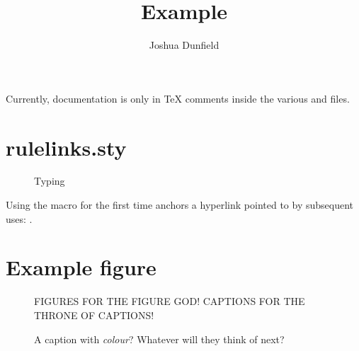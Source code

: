 \documentclass{purple}
\title{Example}
\author{Joshua Dunfield}
\begin{document}
\maketitle

Currently, documentation is only in TeX comments inside the various  and  files.

\section{rulelinks.sty}

\begin{figure}[htbp]
  \centering

  \begin{mathpar}
  \end{mathpar}
  
  \caption{Typing}
  \label{fig:typing}
\end{figure}

Using the macro \texttt{\Backslash} for the first time anchors a hyperlink pointed to
by subsequent uses: \EVar.

\newpage

\section{Example figure}

\begin{figure}[htbp]
  \centering
  
  FIGURES FOR THE FIGURE GOD!  CAPTIONS FOR THE THRONE OF CAPTIONS!

  \caption{A caption with \emph{colour}?  Whatever will they think of next?}
  \label{fig:example}
\end{figure}
\end{document}
